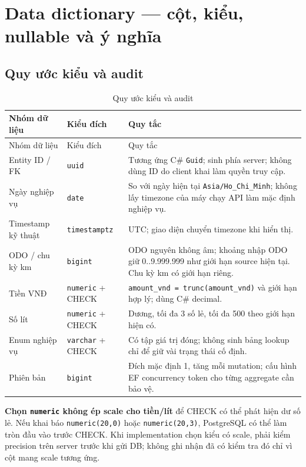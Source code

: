 \section{Data dictionary — cột, kiểu, nullable và ý nghĩa}
\subsection{Quy ước kiểu và audit}
\begin{smalltable}\begin{longtable}{L{3.0cm}L{3.2cm}L{8.2cm}}
\caption{Quy ước kiểu và audit}\label{tab:dictionary-2}\\\toprule
Nhóm dữ liệu & Kiểu đích & Quy tắc\\\midrule\endfirsthead
\toprule Nhóm dữ liệu & Kiểu đích & Quy tắc\\\midrule\endhead
Entity ID / FK & \texttt{uuid} & Tương ứng C\# \texttt{Guid}; sinh phía server; không dùng ID do client khai làm quyền truy cập.\\
Ngày nghiệp vụ & \texttt{date} & So với ngày hiện tại \texttt{Asia/Ho\_\allowbreak{}Chi\_\allowbreak{}Minh}; không lấy timezone của máy chạy API làm mặc định nghiệp vụ.\\
Timestamp kỹ thuật & \texttt{timestamptz} & UTC; giao diện chuyển timezone khi hiển thị.\\
ODO / chu kỳ km & \texttt{bigint} & ODO nguyên không âm; khoảng nhập ODO giữ 0..9.999.999 như giới hạn source hiện tại. Chu kỳ km có giới hạn riêng.\\
Tiền VNĐ & \texttt{numeric} + CHECK & \texttt{amount\_\allowbreak{}vnd = trunc(amount\_\allowbreak{}vnd)} và giới hạn hợp lý; dùng C\# decimal.\\
Số lít & \texttt{numeric} + CHECK & Dương, tối đa 3 số lẻ, tối đa 500 theo giới hạn hiện có.\\
Enum nghiệp vụ & \texttt{varchar} + CHECK & Có tập giá trị đóng; không sinh bảng lookup chỉ để giữ vài trạng thái cố định.\\
Phiên bản & \texttt{bigint} & Đích mặc định 1, tăng mỗi mutation; cấu hình EF concurrency token cho từng aggregate cần bảo vệ.\\
\bottomrule\end{longtable}\end{smalltable}
\textbf{Chọn \texttt{numeric} không ép scale cho tiền/lít} để CHECK có thể phát hiện dư số lẻ. Nếu khai báo \texttt{numeric(20,\allowbreak{}0)} hoặc \texttt{numeric(20,\allowbreak{}3)}, PostgreSQL có thể làm tròn đầu vào trước CHECK. Khi implementation chọn kiểu có scale, phải kiểm precision trên server trước khi gửi DB; không ghi nhận đã có kiểm tra đó chỉ vì cột mang scale tương ứng.\par
